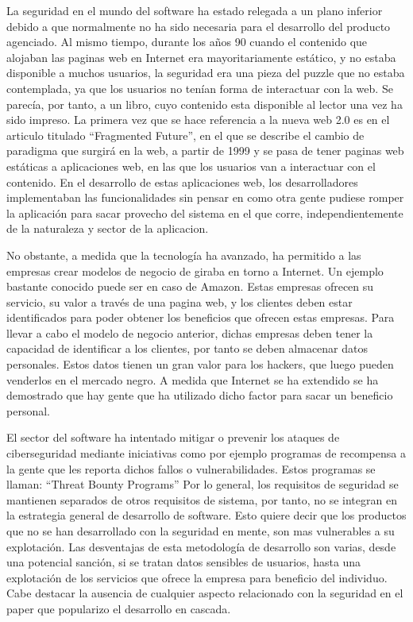 \documentclass[12pt]{report} %
\begin{document}
La seguridad en el mundo del software ha estado relegada a un plano inferior
debido a que normalmente no ha sido necesaria para el desarrollo del producto
agenciado.  Al mismo tiempo, durante los años 90 cuando el contenido que
alojaban las paginas web en Internet era mayoritariamente estático, y no estaba
disponible a muchos usuarios, la seguridad era una pieza del puzzle que no
estaba contemplada, ya que los usuarios no tenían forma de interactuar con la
web.  Se parecía, por tanto, a un libro, cuyo contenido esta disponible al
lector una vez ha sido impreso.  La primera vez que se hace referencia a la
nueva web 2.0 es en el articulo titulado ``Fragmented Future'', en el que se
describe el cambio de paradigma que surgirá en la web, a partir de 1999 y se
pasa de tener paginas web estáticas a aplicaciones web, en las que los usuarios
van a interactuar con el contenido. \cite{DiNucci1999} En el desarrollo de estas
aplicaciones web, los desarrolladores implementaban las funcionalidades sin
pensar en como otra gente pudiese romper la aplicación para sacar provecho del
sistema en el que corre, independientemente de la naturaleza y sector de la
aplicacion.

No obstante, a medida que la tecnología ha avanzado, ha permitido a las empresas
crear modelos de negocio de giraba en torno a Internet.  Un ejemplo bastante
conocido puede ser en caso de Amazon.  Estas empresas ofrecen su servicio, su
valor a través de una pagina web, y los clientes deben estar identificados para
poder obtener los beneficios que ofrecen estas empresas.  Para llevar a cabo el
modelo de negocio anterior, dichas empresas deben tener la capacidad de
identificar a los clientes, por tanto se deben almacenar datos personales.
Estos datos tienen un gran valor para los hackers, que luego pueden venderlos en
el mercado negro.  A medida que Internet se ha extendido se ha demostrado que
hay gente que ha utilizado dicho factor para sacar un beneficio personal.

El sector del software ha intentado mitigar o prevenir los ataques de
ciberseguridad mediante iniciativas como por ejemplo programas de recompensa a
la gente que les reporta dichos fallos o vulnerabilidades.  Estos programas se
llaman: ``Threat Bounty Programs'' Por lo general, los requisitos de seguridad
se mantienen separados de otros requisitos de sistema, por tanto, no se integran
en la estrategia general de desarrollo de software. \cite{Flec2003} Esto quiere
decir que los productos que no se han desarrollado con la seguridad en mente,
son mas vulnerables a su explotación.  Las desventajas de esta metodología de
desarrollo son varias, desde una potencial sanción, si se tratan datos sensibles
de usuarios, hasta una explotación de los servicios que ofrece la empresa para
beneficio del individuo.  Cabe destacar la ausencia de cualquier aspecto
relacionado con la seguridad en el paper que popularizo el desarrollo en
cascada. \cite{royce1970}
\end{document}
